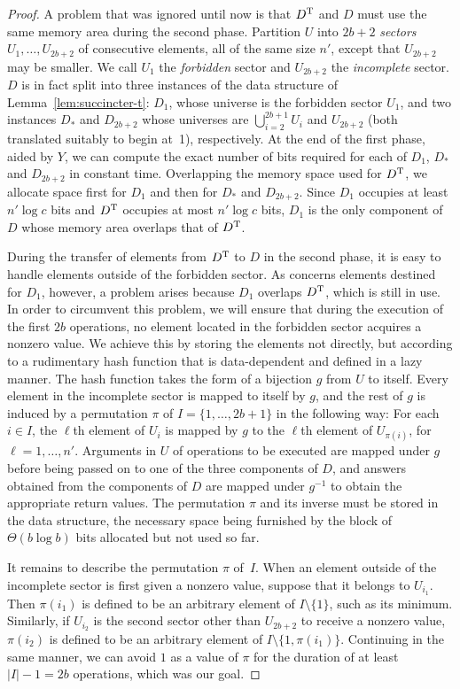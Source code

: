 \documentclass[envcountsame,envcountsect,undated,nolinenumbers]{lnthi}
\begin{document}
\begin{proof}
A problem that was ignored until now is
that $D^{\mbox{\scriptsize T}}$ and $D$ must use the same memory area
during the second phase.
Partition $U$ into $2 b+2$ \emph{sectors}
$U_1,\ldots,U_{2 b+2}$ of consecutive elements,
all of the same size $n'$,
except that $U_{2 b+2}$ may be smaller.
We call $U_1$ the \emph{forbidden} sector
and $U_{2 b+2}$ the \emph{incomplete} sector.
$D$ is in fact split into three instances of
the data structure of Lemma~\ref{lem:succincter-t}:
$D_1$, whose universe is the forbidden sector $U_1$,
and two instances $D_*$ and $D_{2 b+2}$
whose universes are
$\bigcup_{i=2}^{2 b+1} U_i$ and $U_{2 b+2}$
(both translated suitably to begin at~1),
respectively.
At the end of the first phase, aided by $Y$,
we can compute the exact number of bits required
for each of $D_1$, $D_*$ and $D_{2 b+2}$ in constant time.
Overlapping the memory space used for $D^{\mbox{\scriptsize T}}$,
we allocate space first for $D_1$ and then for
$D_*$ and $D_{2 b+2}$.
Since $D_1$ occupies at least $n'\log c$ bits
and $D^{\mbox{\scriptsize T}}$ occupies at most $n'\log c$ bits,
$D_1$ is the only component of $D$ whose memory
area overlaps that of $D^{\mbox{\scriptsize T}}$.

During the transfer of elements from $D^{\mbox{\scriptsize T}}$ to $D$
in the second phase,
it is easy to handle
elements outside of the forbidden sector.
As concerns elements destined for $D_1$, however,
a problem arises because
$D_1$ overlaps $D^{\mbox{\scriptsize T}}$, which is still in use.
In order to circumvent this problem, we will
ensure that during the execution of the
first $2 b$ operations, no element
located in the forbidden sector
acquires a nonzero value.
We achieve this by storing the elements not directly, but
according to a rudimentary hash function that
is data-dependent and defined in a lazy manner.
The hash function takes the form of a bijection
$g$ from $U$ to itself.
Every element in the incomplete sector is mapped to
itself by $g$, and the rest of $g$ is induced
by a permutation $\pi$ of $I=\{1,\ldots,2 b+1\}$
in the following way:
For each $i\in I$, the $\ell$th element
of $U_i$ is mapped by $g$ to the $\ell$th element
of $U_{\pi(i)}$, for $\ell=1,\ldots,n'$.
Arguments in $U$ of operations to be executed
are mapped under $g$ before being passed on
to one of the three components of $D$, and
answers obtained from the components of $D$ are
mapped under $g^{-1}$ to obtain the
appropriate return values.
The permutation $\pi$ and its inverse must
be stored in the data structure, the necessary
space being furnished by the block of
$\Theta(b\log b)$ bits allocated but not used so far.

It remains to describe the permutation $\pi$ of~$I$.
When an element outside of the incomplete sector is
first given a nonzero value,
suppose that it belongs to $U_{i_1}$.
Then $\pi(i_1)$ is defined to be an arbitrary
element of $I\setminus\{1\}$, such as its minimum.
Similarly, if $U_{i_2}$ is the second sector
other than $U_{2 b+2}$ to receive
a nonzero value, $\pi(i_2)$ is defined to
be an arbitrary element of
$I\setminus\{1,\pi(i_1)\}$.
Continuing in the same manner, we can avoid
$1$ as a value of $\pi$ for the duration
of at least $|I|-1=2 b$ operations, which
was our goal.


\end{proof}
\end{document}
